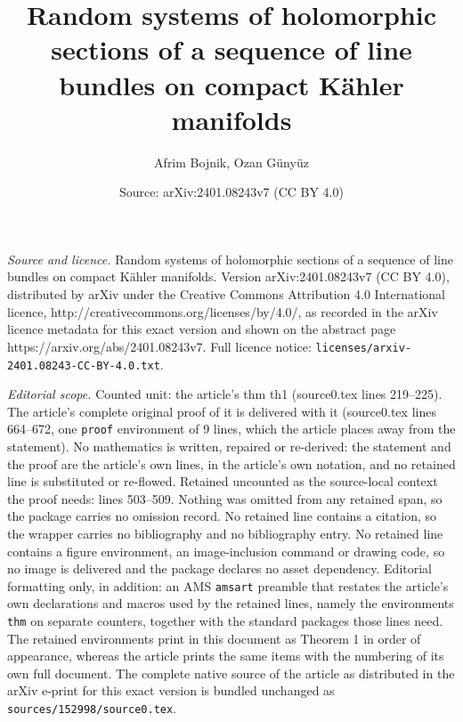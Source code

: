 \documentclass[10pt,a4paper]{amsart}
\title{Random systems of holomorphic sections of a sequence of line bundles on compact K\"{a}hler manifolds}
\author{Afrim Bojnik, Ozan G\"uny\"uz}
\date{Source: arXiv:2401.08243v7 (CC BY 4.0)}
\begin{document}
\maketitle

\noindent\emph{Source and licence.} Random systems of holomorphic sections of a sequence of line bundles on compact K\"{a}hler manifolds. Version arXiv:2401.08243v7 (CC BY 4.0), distributed by arXiv under the Creative Commons Attribution 4.0 International licence, http://creativecommons.org/licenses/by/4.0/, as recorded in the arXiv licence metadata for this exact version and shown on the abstract page https://arxiv.org/abs/2401.08243v7. Full licence notice: \texttt{licenses/arxiv-2401.08243-CC-BY-4.0.txt}.\par\smallskip

\noindent\textit{Editorial scope.} Counted unit: the article's thm th1 (source0.tex lines 219--225). The article's complete original proof of it is delivered with it (source0.tex lines 664--672, one \texttt{proof} environment of 9 lines, which the article places away from the statement). No mathematics is written, repaired or re-derived: the statement and the proof are the article's own lines, in the article's own notation, and no retained line is substituted or re-flowed.  Retained uncounted as the source-local context the proof needs: lines 503--509.  Nothing was omitted from any retained span, so the package carries no omission record.  No retained line contains a citation, so the wrapper carries no bibliography and no bibliography entry.  No retained line contains a figure environment, an image-inclusion command or drawing code, so no image is delivered and the package declares no asset dependency.  Editorial formatting only, in addition: an AMS \texttt{amsart} preamble that restates the article's own declarations and macros used by the retained lines, namely the environments \texttt{thm} on separate counters, together with the standard packages those lines need.  The retained environments print in this document as Theorem 1 in order of appearance, whereas the article prints the same items with the numbering of its own full document.  The complete native source of the article as distributed in the arXiv e-print for this exact version is bundled unchanged as \texttt{sources/152998/source0.tex}.
\end{document}
